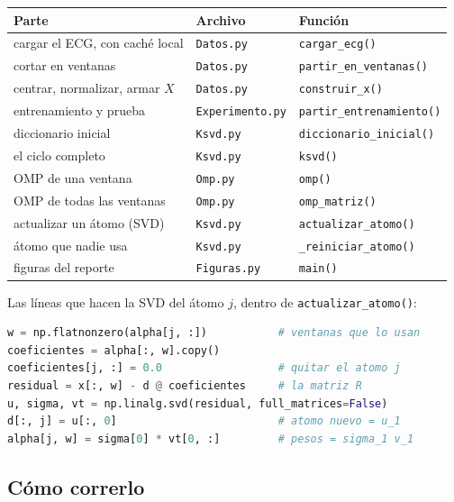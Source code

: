 \documentclass[11pt,letterpaper]{article}
\begin{document}
\begin{center}
\begin{tabular}{lll}
    \toprule
    \textbf{Parte} & \textbf{Archivo} & \textbf{Función} \\
    \midrule
    cargar el ECG, con caché local & \texttt{Datos.py}
        & \texttt{cargar\_ecg()} \\
    cortar en ventanas             & \texttt{Datos.py}
        & \texttt{partir\_en\_ventanas()} \\
    centrar, normalizar, armar $X$ & \texttt{Datos.py}
        & \texttt{construir\_x()} \\
    entrenamiento y prueba         & \texttt{Experimento.py}
        & \texttt{partir\_entrenamiento()} \\
    diccionario inicial            & \texttt{Ksvd.py}
        & \texttt{diccionario\_inicial()} \\
    el ciclo completo              & \texttt{Ksvd.py}
        & \texttt{ksvd()} \\
    OMP de una ventana             & \texttt{Omp.py}
        & \texttt{omp()} \\
    OMP de todas las ventanas      & \texttt{Omp.py}
        & \texttt{omp\_matriz()} \\
    actualizar un átomo (SVD)      & \texttt{Ksvd.py}
        & \texttt{actualizar\_atomo()} \\
    átomo que nadie usa            & \texttt{Ksvd.py}
        & \texttt{\_reiniciar\_atomo()} \\
    figuras del reporte            & \texttt{Figuras.py}
        & \texttt{main()} \\
    \bottomrule
\end{tabular}
\end{center}

Las líneas que hacen la SVD del átomo $j$, dentro de
\texttt{actualizar\_atomo()}:

\begin{lstlisting}[style=codigo, language=Python]
w = np.flatnonzero(alpha[j, :])           # ventanas que lo usan
coeficientes = alpha[:, w].copy()
coeficientes[j, :] = 0.0                  # quitar el atomo j
residual = x[:, w] - d @ coeficientes     # la matriz R
u, sigma, vt = np.linalg.svd(residual, full_matrices=False)
d[:, j] = u[:, 0]                         # atomo nuevo = u_1
alpha[j, w] = sigma[0] * vt[0, :]         # pesos = sigma_1 v_1
\end{lstlisting}

\subsection*{Cómo correrlo}
\end{document}
